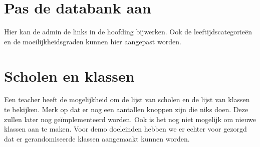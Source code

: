 \documentclass[]{article}
\begin{document}
\section{Pas de databank aan}
Hier kan de admin de links in de hoofding bijwerken. Ook de leeftijdscategorieën en de moeilijkheidsgraden kunnen hier aangepast worden.

\section{Scholen en klassen}
Een teacher heeft de mogelijkheid om de lijst van scholen en de lijst van klassen te bekijken. Merk op dat er nog een aantallen knoppen zijn die niks doen. Deze 
zullen later nog ge\"implementeerd worden. Ook is het nog niet mogelijk om nieuwe klassen aan te maken. Voor demo
doeleinden hebben we er echter voor gezorgd dat er gerandomiseerde klassen aangemaakt kunnen worden. 
\end{document}

